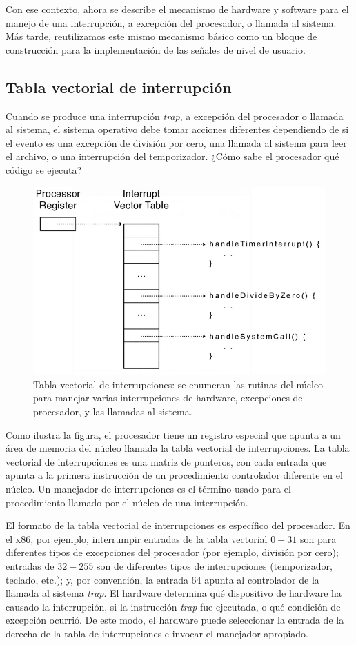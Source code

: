 \documentclass[10pt]{book}
\begin{document}
Con ese contexto, ahora se describe el mecanismo de hardware y software para el manejo de una interrupción, a excepción del procesador, o llamada al sistema. Más tarde, reutilizamos este mismo mecanismo básico como un bloque de construcción para la implementación de las señales de nivel de usuario.

\subsection{Tabla vectorial de interrupción}
Cuando se produce una interrupción \textit{trap}, a excepción del procesador o llamada al sistema, el sistema operativo debe tomar acciones diferentes dependiendo de si el evento es una excepción de división por cero, una llamada al sistema para leer el archivo, o una interrupción del temporizador. ¿Cómo sabe el procesador qué código se ejecuta?
\begin{figure}[tbhp]
\centerline{\includegraphics[scale=0.55]{img/fig05}}
\caption{Tabla vectorial de interrupciones: se enumeran las rutinas del núcleo para manejar varias interrupciones de hardware, excepciones del procesador, y las llamadas al sistema.}
\label{fig0}
\end{figure}

Como ilustra la figura, el procesador tiene un registro especial que apunta a un área de memoria del núcleo llamada la tabla vectorial de interrupciones. La tabla vectorial de interrupciones es una matriz de punteros, con cada entrada que apunta a la primera instrucción de un procedimiento controlador diferente en el núcleo. Un manejador de interrupciones es el término usado para el procedimiento llamado por el núcleo de una interrupción.

El formato de la tabla vectorial de interrupciones es específico del procesador. En el x86, por ejemplo, interrumpir entradas de la tabla vectorial $0-31$ son para diferentes tipos de excepciones del procesador (por ejemplo, división por cero); entradas de $32 - 255$ son de diferentes tipos de interrupciones (temporizador, teclado, etc.); y, por convención, la entrada $64$ apunta al controlador de la llamada al sistema \textit{trap}. El hardware determina qué dispositivo de hardware ha causado la interrupción, si la instrucción \textit{trap} fue ejecutada, o qué condición de excepción ocurrió. De este modo, el hardware puede seleccionar la entrada de la derecha de la tabla de interrupciones e invocar el manejador apropiado.
\end{document}
